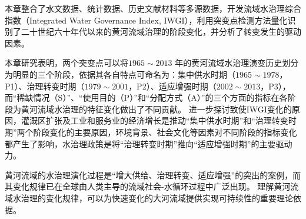 本章整合了水文数据、统计数据、历史文献材料等多源数据，开发流域水治理综合指数（Integrated Water Governance Index, IWGI），利用突变点检测方法量化识别了二十世纪六十年代以来的黄河流域治理的阶段变化，并分析了转变发生的驱动因素。

本章研究表明，两个突变点可以将$1965 \sim 2013$ 年的黄河流域水治理演变历史划分为明显的三个阶段，依据其各自特点可命名为：集中供水时期（$1965 \sim 1978$，P1）、治理转变时期（$1979 \sim 2001$，P2）、适应增强时期（$2002 \sim 2013$，P3），而“稀缺情况（S）”、“使用目的（P）”和“分配方式（A）”的三个方面的指标在各阶段为黄河流域水治理的特征变化做出了不同贡献。
进一步探讨致使IWGI变化的原因，灌溉区扩张及工业和服务业的经济增长是推动“集中供水时期”和“治理转变时期”两个阶段变化的主要原因，环境背景、社会文化等因素对不同阶段的指标变化都产生了影响，水治理政策是将“治理转变时期”推向“适应增强时期”的主要驱动力。

黄河流域的水治理演化过程是“增大供给、治理转变、适应增强”的突出的案例，而其变化规律已在全球由人类主导的流域社会-水循环过程中广泛出现。
理解黄河流域水治理的变化规律，可以为快速变化的大河流域提供实现可持续性的重要理论依据。

